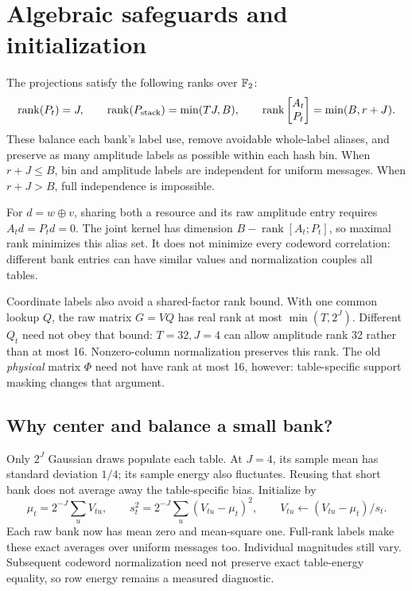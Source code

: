 \documentclass[11pt]{article}
\begin{document}
\section{Algebraic safeguards and initialization}

The projections satisfy the following ranks over $\mathbb{F}_2$:
\[
 \operatorname{rank}(P_t)=J,\qquad
 \operatorname{rank}(P_{\rm stack})=\min(TJ,B),\qquad
 \operatorname{rank}\begin{bmatrix}A_t\\P_t\end{bmatrix}=\min(B,r+J).
\]
These balance each bank's label use, remove avoidable whole-label aliases, and preserve as many amplitude labels
as possible within each hash bin. When $r+J\le B$, bin and amplitude labels are independent for uniform messages.
When $r+J>B$, full independence is impossible.

For $d=w\oplus v$, sharing both a resource and its raw amplitude entry requires $A_td=P_td=0$.
The joint kernel has dimension $B-\operatorname{rank}[A_t;P_t]$, so maximal rank minimizes this alias set.
It does not minimize every codeword correlation: different bank entries can have similar values and normalization
couples all tables.

Coordinate labels also avoid a shared-factor rank bound. With one common lookup $Q$, the raw matrix $G=VQ$
has real rank at most $\min(T,2^J)$. Different $Q_t$ need not obey that bound: $T=32,J=4$ can allow amplitude
rank 32 rather than at most 16. Nonzero-column normalization preserves this rank. The old \emph{physical} matrix
$\Phi$ need not have rank at most 16, however: table-specific support masking changes that argument.

\subsection{Why center and balance a small bank?}

Only $2^J$ Gaussian draws populate each table. At $J=4$, its sample mean has standard deviation $1/4$; its
sample energy also fluctuates. Reusing that short bank does not average away the table-specific bias. Initialize by
\[
 \mu_t=2^{-J}\sum_uV_{tu},\qquad
 s_t^2=2^{-J}\sum_u(V_{tu}-\mu_t)^2,\qquad
 V_{tu}\leftarrow(V_{tu}-\mu_t)/s_t.
\]
Each raw bank now has mean zero and mean-square one. Full-rank labels make these exact averages over uniform
messages too. Individual magnitudes still vary. Subsequent codeword normalization need not preserve exact
table-energy equality, so row energy remains a measured diagnostic.
\end{document}
